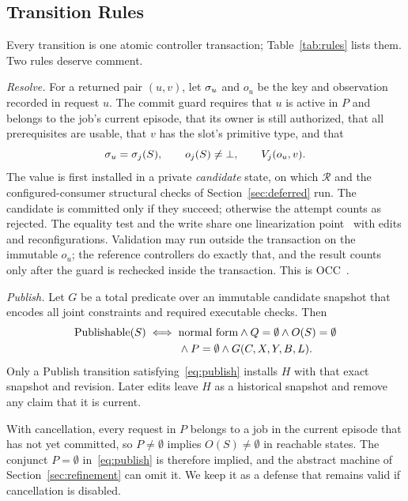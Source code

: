 \subsection{Transition Rules}\label{sec:rules}
Every transition is one atomic controller transaction; Table~\ref{tab:rules} lists them. Two rules deserve comment.

\emph{Resolve.} For a returned pair $(u,v)$, let $\sigma_u$ and $o_u$ be the key and observation recorded in request $u$. The commit guard requires that $u$ is active in $P$ and belongs to the job's current episode, that its owner is still authorized, that all prerequisites are usable, that $v$ has the slot's primitive type, and that
\begin{equation}\label{eq:guard}
\sigma_u=\sigma_j(S),\qquad o_j(S)\ne\bot,\qquad V_j(o_u,v).
\end{equation}
The value is first installed in a private \emph{candidate} state, on which $\mathcal R$ and the configured-consumer structural checks of Section~\ref{sec:deferred} run. The candidate is committed only if they succeed; otherwise the attempt counts as rejected. The equality test and the write share one linearization point~\cite{herlihy1990linearizability} with edits and reconfigurations. Validation may run outside the transaction on the immutable $o_u$; the reference controllers do exactly that, and the result counts only after the guard is rechecked inside the transaction. This is OCC~\cite{occ}.

\emph{Publish.} Let $G$ be a total predicate over an immutable candidate snapshot that encodes all joint constraints and required executable checks. Then
\begin{equation}\label{eq:publish}
\begin{split}\operatorname{Publishable}(S)\iff{}&\text{normal form}\land Q=\emptyset\land O(S)=\emptyset\\&{}\land P=\emptyset\land G(C,X,Y,B,L).\end{split}
\end{equation}
Only a Publish transition satisfying~\eqref{eq:publish} installs $H$ with that exact snapshot and revision. Later edits leave $H$ as a historical snapshot and remove any claim that it is current.

\begin{remark}[Redundancy of $P=\emptyset$]\label{rem:pending}
With cancellation, every request in $P$ belongs to a job in the current episode that has not yet committed, so $P\neq\emptyset$ implies $O(S)\neq\emptyset$ in reachable states. The conjunct $P=\emptyset$ in~\eqref{eq:publish} is therefore implied, and the abstract machine of Section~\ref{sec:refinement} can omit it. We keep it as a defense that remains valid if cancellation is disabled.
\end{remark}

